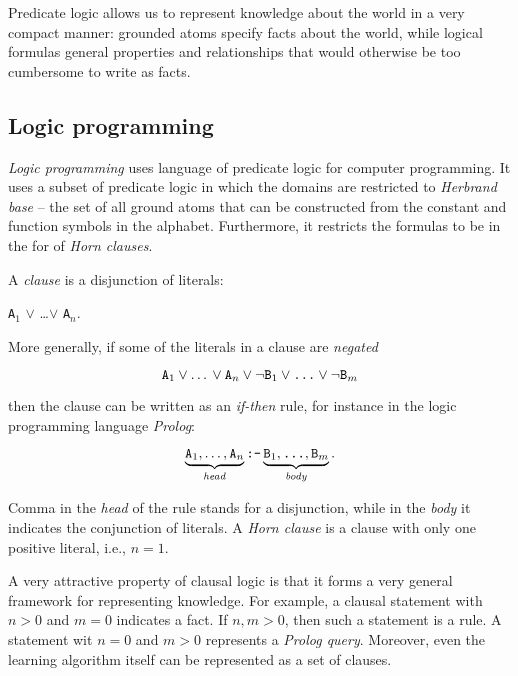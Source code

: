  
 
 
 Predicate logic allows us to represent knowledge about the world in a very compact manner: grounded atoms specify facts about the world, while logical formulas general properties and relationships that would otherwise be too cumbersome to write as facts.
 
 
 
 


 



\subsection{Logic programming}


\textit{Logic programming} uses language of predicate logic for computer programming.
It uses a subset of predicate logic in which the domains are restricted to \textit{Herbrand base} -- the set of all ground atoms that can be constructed from the constant and function symbols in the alphabet.
Furthermore, it restricts the formulas to be in the for of \textit{Horn clauses}.


A \textit{clause} is a disjunction of literals:

\begin{center}
	\texttt{A}$_1$  $\vee$ \ldots $\vee$ \texttt{A}$_n$.
\end{center}

More generally, if some of the literals in a clause are \textit{negated}

$$ \text{\texttt{A}}_1 \vee \text{\ldots} \vee \text{\texttt{A}}_n \vee \neg \text{\texttt{B}}_1 \vee \text{\texttt{\ldots}} \vee \neg \text{\texttt{B}}_m$$

then the clause can be written as an \textit{if-then} rule, for instance in the logic programming language \textit{Prolog}:

$$ \underbrace{\text{\texttt{A}}_1, \text{\ldots}, \text{\texttt{A}}_n}_{\text{\textit{head}}} \text{\texttt{:-}} \underbrace{\text{\texttt{B}}_1, \text{\texttt{\ldots}}, \text{\texttt{B}}_m}_{\text{\textit{body}}}.$$

Comma in the \textit{head} of the rule stands for a disjunction, while in the \textit{body} it indicates the conjunction of literals.
A \textit{Horn clause} is a clause with only one positive literal, i.e., $n = 1$.



A very attractive property of clausal logic is that it forms a very general framework for representing knowledge.
For example, a clausal statement with $n > 0$ and $m = 0$ indicates a fact.
If $n, m>0$, then such a statement is a rule.
A statement wit $n=0$ and $m > 0$ represents a \textit{Prolog query}.
Moreover, even the learning algorithm itself can be represented as a set of clauses.



